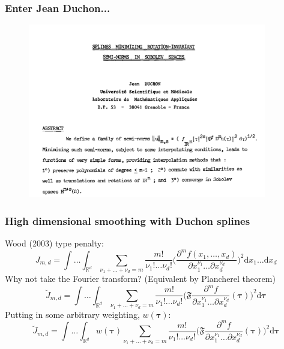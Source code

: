\documentclass[ignorenonframetext]{beamer} %
\begin{document}
\begin{frame}
	\frametitle{Enter Jean Duchon...} 
	\begin{figure}
		\includegraphics[height=3in]{figs/Duchon-paper.png}
	\end{figure}

\end{frame}

\begin{frame}
	\frametitle{High dimensional smoothing with Duchon splines}
	Wood (2003) type penalty:
	\begin{equation*}
		J_{m,d} = \int \ldots \int_{\mathbb{R}^d} \sum_{\nu_1 + \dots + \nu_d=m} \frac{m!}{\nu_1! \dots \nu_d!}\Big( \frac{\partial^m f(x_1,\dots,x_d)}{\partial x_1^{\nu_1} \ldots  \partial x_d^{\nu_d}} \Big)^2 \text{d} x_1 \ldots  \text{d} x_d
	\end{equation*}
	Why not take the Fourier transform? (Equivalent by Plancherel theorem)
	\begin{equation*}
		\breve{J}_{m,d} = \int \ldots \int_{\mathbb{R}^d} \sum_{\nu_1 + \dots + \nu_d=m} \frac{m!}{\nu_1! \dots \nu_d!}\Big( \mathfrak{F} \frac{\partial^m f}{\partial x_1^{\nu_1} \ldots  \partial x_d^{\nu_d}}(\boldsymbol{\tau}) \Big)^2 \text{d} \boldsymbol{\tau}
	\end{equation*}
	Putting in some arbitrary weighting, $w(\boldsymbol{\tau})$:
	\begin{equation*}
		\breve{J}_{m,d} = \int \ldots \int_{\mathbb{R}^d} w(\boldsymbol{\tau}) \sum_{\nu_1 + \dots + \nu_d=m} \frac{m!}{\nu_1! \dots \nu_d!}\Big( \mathfrak{F} \frac{\partial^m f}{\partial x_1^{\nu_1} \ldots  \partial x_d^{\nu_d}}(\boldsymbol{\tau}) \Big)^2 \text{d} \boldsymbol{\tau}
	\end{equation*}
\end{frame}
\end{document}
